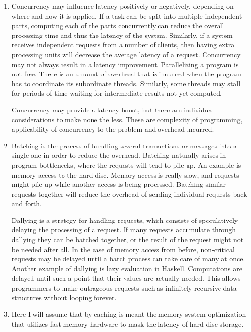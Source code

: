 \documentclass[11pt]{article}
\begin{document}
\begin{enumerate}
\begin{enumerate}
  \item
    Concurrency may influence latency positively or negatively, depending on where
    and how it is applied. If a task can be split into multiple independent parts,
    computing each of the parts concurrently can reduce the overall processing time and
    thus the latency of the system. Similarly, if a system receives independent
    requests from a number of clients, then having extra processing units will
    decrease the average latency of a request.  Concurrency may not always result in
    a latency improvement. Parallelizing a program is not free. There is an amount
    of overhead that is incurred when the program has to coordinate its subordinate
    threads. Similarly, some threads may stall for periods of time waiting for
    intermediate results not yet computed.

    Concurrency may provide a latency boost, but there are individual considerations
    to make none the less. These are complexity of programming, applicability of
    concurrency to the problem and overhead incurred.

  \item
    Batching is the process of bundling several transactions or messages into a
    single one in order to reduce the overhead. Batching naturally arises in
    program bottlenecks, where the requests will tend to pile up. An example is
    memory access to the hard disc. Memory access is really slow, and requests
    might pile up while another access is being processed. Batching similar
    requests together will reduce the overhead of sending individual requests
    back and forth.

    Dallying is a strategy for handling requests, which consists of speculatively
    delaying the processing of a request. If many requests accumulate through
    dallying they can be batched together, or the result of the request might not be
    needed after all. In the case of memory access from before, non-critical
    requests may be delayed until a batch process can take care of many at once.
    Another example of dallying is lazy evaluation in Haskell. Computations are
    delayed until such a point that their values are actually needed. This
    allows programmers to make outrageous requests such as infinitely recursive
    data structures without looping forever.

  \item
    Here I will assume that by caching is meant the memory system optimization
    that utilizes fast memory hardware to mask the latency of hard disc storage.


\end{enumerate}
\end{enumerate}
\end{document}
